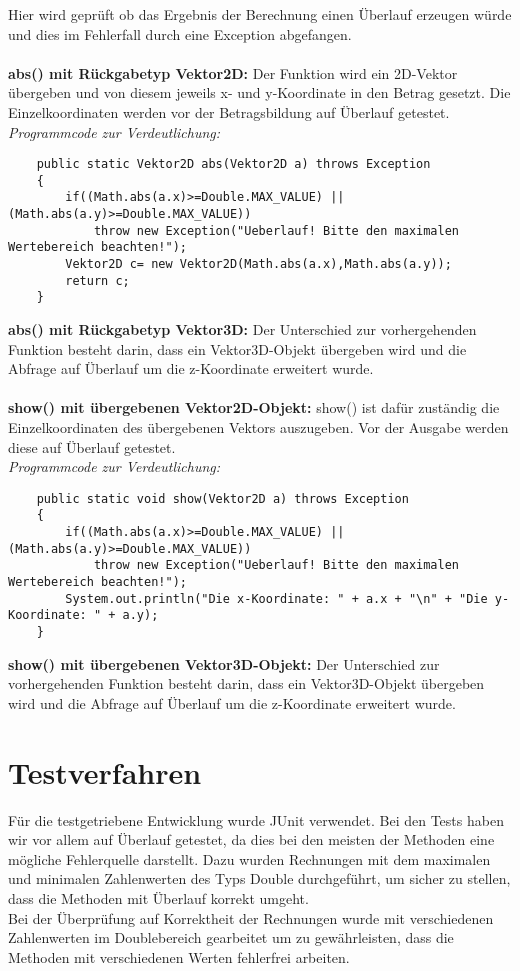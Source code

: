 \documentclass[a4paper,11pt]{scrartcl}
\begin{document}
Hier wird geprüft ob das Ergebnis der Berechnung einen Überlauf erzeugen würde und dies im Fehlerfall durch eine Exception abgefangen.\\
\\
\textbf{abs() mit Rückgabetyp Vektor2D:} Der Funktion wird ein 2D-Vektor übergeben und von diesem jeweils x- und y-Koordinate in den Betrag gesetzt. Die Einzelkoordinaten werden vor der Betragsbildung auf Überlauf getestet.\\
\textit{Programmcode zur Verdeutlichung:}
\begin{lstlisting}
	public static Vektor2D abs(Vektor2D a) throws Exception
	{
		if((Math.abs(a.x)>=Double.MAX_VALUE) || (Math.abs(a.y)>=Double.MAX_VALUE))
			throw new Exception("Ueberlauf! Bitte den maximalen Wertebereich beachten!");
		Vektor2D c= new Vektor2D(Math.abs(a.x),Math.abs(a.y));
		return c;
	}
\end{lstlisting} $\;$ \\
\textbf{abs() mit Rückgabetyp Vektor3D:} Der Unterschied zur vorhergehenden Funktion besteht darin, dass ein Vektor3D-Objekt übergeben wird und die Abfrage auf Überlauf um die z-Koordinate erweitert wurde.\\
\\
\textbf{show() mit übergebenen Vektor2D-Objekt:} show() ist dafür zuständig die Einzelkoordinaten des übergebenen Vektors auszugeben. Vor der Ausgabe werden diese auf Überlauf getestet.\\
\textit{Programmcode zur Verdeutlichung:}
\begin{lstlisting}
	public static void show(Vektor2D a) throws Exception
	{
		if((Math.abs(a.x)>=Double.MAX_VALUE) || (Math.abs(a.y)>=Double.MAX_VALUE))
			throw new Exception("Ueberlauf! Bitte den maximalen Wertebereich beachten!");
		System.out.println("Die x-Koordinate: " + a.x + "\n" + "Die y-Koordinate: " + a.y);
	}
\end{lstlisting} $\;$ \\
\textbf{show() mit übergebenen Vektor3D-Objekt:} Der Unterschied zur vorhergehenden Funktion besteht darin, dass ein Vektor3D-Objekt übergeben wird und die Abfrage auf Überlauf um die z-Koordinate erweitert wurde.\\
\section{Testverfahren}
Für die testgetriebene Entwicklung wurde JUnit verwendet. Bei den Tests haben wir vor allem auf Überlauf getestet, da dies bei den meisten der Methoden eine mögliche Fehlerquelle darstellt. Dazu wurden Rechnungen mit dem maximalen und minimalen Zahlenwerten des Typs Double durchgeführt, um sicher zu stellen, dass die Methoden mit Überlauf korrekt umgeht. 
\\
Bei der Überprüfung auf Korrektheit der Rechnungen wurde mit verschiedenen Zahlenwerten im Doublebereich gearbeitet um zu gewährleisten, dass die Methoden mit verschiedenen Werten fehlerfrei arbeiten. 
\end{document}
